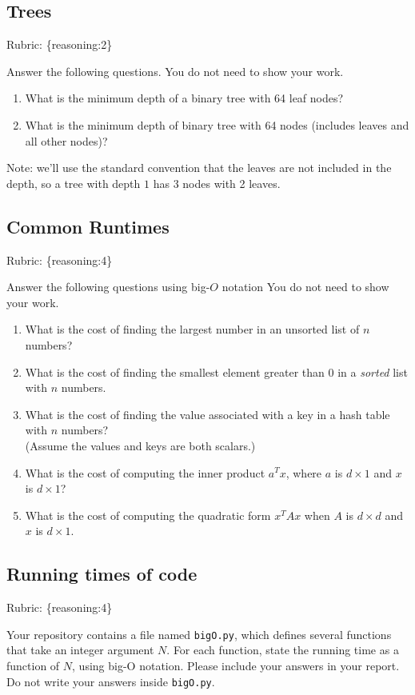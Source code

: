 \documentclass{article}
\def\rubric#1{\gre{Rubric: \{#1\}}}{}
\def\blu#1{{\color{blu}#1}}
\def\gre#1{{\color{gre}#1}}
\begin{document}
\subsection{Trees}
\rubric{reasoning:2}

\blu{Answer the following questions.} You do not need to show your work.

\begin{enumerate}
\item What is the minimum depth of a binary tree with 64 leaf nodes?
\item What is the minimum depth of binary tree with 64 nodes (includes leaves and all other nodes)?
\end{enumerate}
Note: we'll use the standard convention that the leaves are not included in the depth, so a tree with depth $1$ has 3 nodes with 2 leaves.

\subsection{Common Runtimes}
\rubric{reasoning:4}

\blu{Answer the following questions using big-$O$ notation} You do not need to show your work.
\begin{enumerate}
\item What is the cost of finding the largest number in an unsorted list of $n$ numbers?
\item What is the cost of finding the smallest element greater than 0 in a \emph{sorted} list with $n$ numbers.
\item What is the cost of finding the value associated with a key in a hash table with $n$ numbers? \\(Assume the values and keys are both scalars.)
\item What is the cost of computing the inner product $a^Tx$, where $a$ is $d \times 1$ and $x$ is $d \times 1$?
\item What is the cost of computing the quadratic form $x^TAx$ when $A$ is $d \times d$ and $x$ is $d \times 1$.
\end{enumerate}

\subsection{Running times of code}
\rubric{reasoning:4}

Your repository contains a file named \texttt{bigO.py}, which defines several functions
that take an integer argument $N$. For each function, \blu{state the running time as a function of $N$, using big-O notation}.
Please include your answers in your report. Do not write your answers inside \texttt{bigO.py}.
\end{document}
